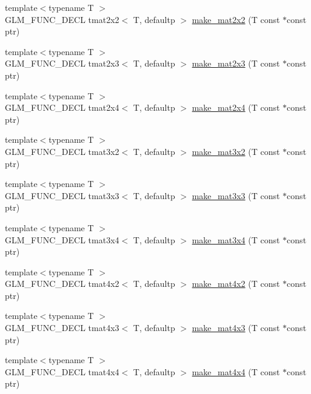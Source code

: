\begin{DoxyCompactItemize}
\item 
{\footnotesize template$<$typename T $>$ }\\G\+L\+M\+\_\+\+F\+U\+N\+C\+\_\+\+D\+E\+C\+L tmat2x2$<$ T, defaultp $>$ \hyperlink{group__gtc__type__ptr_gadb29e510762e1042069cb28bf24ae990}{make\+\_\+mat2x2} (T const $\ast$const ptr)
\item 
{\footnotesize template$<$typename T $>$ }\\G\+L\+M\+\_\+\+F\+U\+N\+C\+\_\+\+D\+E\+C\+L tmat2x3$<$ T, defaultp $>$ \hyperlink{group__gtc__type__ptr_ga37988c6dd941f617cdfab86d54375fc1}{make\+\_\+mat2x3} (T const $\ast$const ptr)
\item 
{\footnotesize template$<$typename T $>$ }\\G\+L\+M\+\_\+\+F\+U\+N\+C\+\_\+\+D\+E\+C\+L tmat2x4$<$ T, defaultp $>$ \hyperlink{group__gtc__type__ptr_ga6dfb2ac10859b0cc8e3893ea84fa95b5}{make\+\_\+mat2x4} (T const $\ast$const ptr)
\item 
{\footnotesize template$<$typename T $>$ }\\G\+L\+M\+\_\+\+F\+U\+N\+C\+\_\+\+D\+E\+C\+L tmat3x2$<$ T, defaultp $>$ \hyperlink{group__gtc__type__ptr_gabe1e5066608a66da7a94f802b57b4eed}{make\+\_\+mat3x2} (T const $\ast$const ptr)
\item 
{\footnotesize template$<$typename T $>$ }\\G\+L\+M\+\_\+\+F\+U\+N\+C\+\_\+\+D\+E\+C\+L tmat3x3$<$ T, defaultp $>$ \hyperlink{group__gtc__type__ptr_ga3cbe7adf857c867cee77eae4617abadd}{make\+\_\+mat3x3} (T const $\ast$const ptr)
\item 
{\footnotesize template$<$typename T $>$ }\\G\+L\+M\+\_\+\+F\+U\+N\+C\+\_\+\+D\+E\+C\+L tmat3x4$<$ T, defaultp $>$ \hyperlink{group__gtc__type__ptr_gac083edd180ab4d4b817acc60c516209b}{make\+\_\+mat3x4} (T const $\ast$const ptr)
\item 
{\footnotesize template$<$typename T $>$ }\\G\+L\+M\+\_\+\+F\+U\+N\+C\+\_\+\+D\+E\+C\+L tmat4x2$<$ T, defaultp $>$ \hyperlink{group__gtc__type__ptr_ga967a5b934e67ff9a6d1d0d27a377a264}{make\+\_\+mat4x2} (T const $\ast$const ptr)
\item 
{\footnotesize template$<$typename T $>$ }\\G\+L\+M\+\_\+\+F\+U\+N\+C\+\_\+\+D\+E\+C\+L tmat4x3$<$ T, defaultp $>$ \hyperlink{group__gtc__type__ptr_ga4d42daced532b33cc672280e48670a51}{make\+\_\+mat4x3} (T const $\ast$const ptr)
\item 
{\footnotesize template$<$typename T $>$ }\\G\+L\+M\+\_\+\+F\+U\+N\+C\+\_\+\+D\+E\+C\+L tmat4x4$<$ T, defaultp $>$ \hyperlink{group__gtc__type__ptr_gaf605a5f5e2ff594e8d404b2855b09541}{make\+\_\+mat4x4} (T const $\ast$const ptr)

\end{DoxyCompactItemize}
